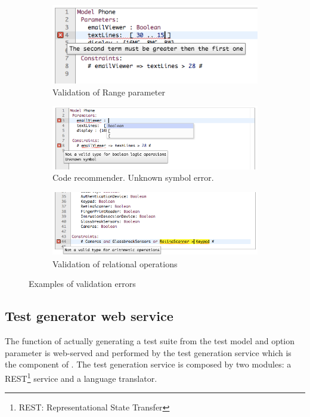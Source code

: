 \begin{tikzborder}{\cite{Gargantini16:validation}}
\begin{tikzborder}{\cite{gargantini_combinatorial_2017}}
\begin{tikzborder}{\cite{gargantini_combinatorial_2017}}
\begin{tikzborder}{\cite{garn2019}}
\begin{tikzborder}{\cite{arcaini2019achieving}}
\begin{figure}[bt!]
	\centering
	\begin{subfigure}{\columnwidth}
		\includegraphics[width=.6\columnwidth]{images/validation1.png}\caption{Validation of Range parameter}
	\end{subfigure}
	
	\begin{subfigure}{\columnwidth}
		\includegraphics[width=.8\columnwidth]{images/validation2.png}\caption{Code recommender. Unknown symbol error.}
	\end{subfigure}
	
	\begin{subfigure}{\columnwidth}
		\includegraphics[width=.65\columnwidth]{images/validation3.png}\caption{Validation of relational operations}
	\end{subfigure}
	\caption{Examples of \ctwedge validation errors}\label{fig:validation}
\end{figure}


\subsection{Test generator web service}

\begin{tikzborder}{}
The function of actually generating a test suite from the test model and option parameter is web-served and performed by the test generation service which is the component of \ctwedge.
The test generation service is composed by two modules: a REST\footnote{REST: Representational State Transfer} service and a language translator.


\end{tikzborder}
\end{tikzborder}
\end{tikzborder}
\end{tikzborder}
\end{tikzborder}
\end{tikzborder}
